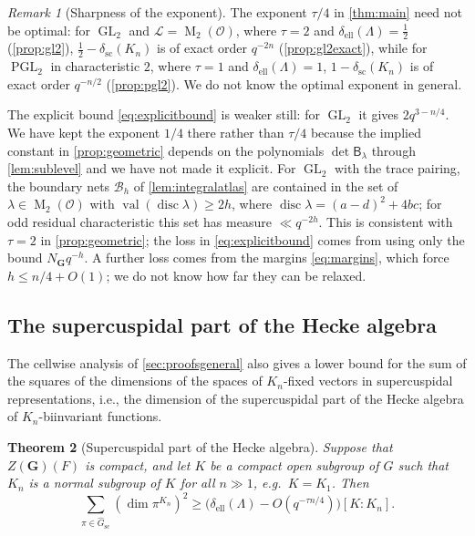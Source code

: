 \documentclass[11pt,reqno]{amsart}
\numberwithin{equation}{section}
\theoremstyle{plain}
\newtheorem{theorem}{Theorem}[section]
\theoremstyle{definition}
\theoremstyle{remark}
\newtheorem{remark}[theorem]{Remark}
\theoremstyle{plain}
\newcommand{\OO}{\mathcal{O}}    %
\newcommand{\Lat}{\mathcal{L}}   %
\newcommand{\dLat}{\Lambda}      %
\newcommand{\bG}{\mathbf{G}}     %
\newcommand{\g}{\mathfrak{g}}    %
\newcommand{\gd}{\mathfrak{g}^*} %
\newcommand{\scd}[1]{\delta_{\mathrm{sc}}(#1)}
\newcommand{\elld}[2][]{\delta_{\mathrm{ell}}^{#1}(#2)}  %
\newcommand{\Bad}{\mathcal{B}}   %
\newcommand{\bnets}{boundary nets}
\newcommand{\Pcss}{\mathscr{P}^{\mathrm{ss}}_{\mathrm{max}}}  %
\newcommand{\Nss}{N_{\bG}}  %
\newcommand{\Gsc}{\widehat{G}_{\mathrm{sc}}}    %
\DeclareMathOperator{\val}{val}
\DeclareMathOperator{\GL}{GL}
\DeclareMathOperator{\PGL}{PGL}
\DeclareMathOperator{\Mat}{M}
\DeclareMathOperator{\disc}{disc}
\newcommand{\eexp}{\tau}
\newcommand{\lf}{\lambda}
\newcommand{\Bf}{\mathsf{B}}
\begin{document}
\begin{remark}[Sharpness of the exponent]\label{rem:sharpness}
The exponent $\eexp/4$ in \cref{thm:main} need not be optimal:
for $\GL_2$ and $\Lat=\Mat_2(\OO)$, where $\eexp=2$ and
$\elld{\dLat}=\frac12$ (\cref{prop:gl2}), $\frac12-\scd{K_n}$ is of exact order $q^{-2n}$ (\cref{prop:gl2exact}), while for $\PGL_2$
in characteristic $2$, where $\eexp=1$ and $\elld{\dLat}=1$, $1-\scd{K_n}$ is of exact
order $q^{-n/2}$ (\cref{prop:pgl2}). We do not know the optimal exponent in general.

The explicit bound \eqref{eq:explicitbound} is weaker still: for $\GL_2$ it
gives $2q^{3-n/4}$. We have kept the exponent $1/4$ there rather than
$\eexp/4$ because the implied constant in \cref{prop:geometric} depends on the
polynomials $\det \Bf_\lf$ through \cref{lem:sublevel} and we have not
made it explicit.
For $\GL_2$ with the trace pairing, the \bnets{} $\Bad_h$ of \cref{lem:integralatlas} are
contained in the set of $\lf\in\Mat_2(\OO)$ with $\val(\disc\lf)\ge2h$, where
$\disc\lf=(a-d)^2+4bc$; for odd residual characteristic this set has measure
$\ll q^{-2h}$. This is consistent with $\eexp=2$ in \cref{prop:geometric};
the loss in \eqref{eq:explicitbound} comes from using only the bound
$\Nss q^{-h}$. A further loss comes from the margins
\eqref{eq:margins}, which force $h\le n/4+O(1)$; we do not know how far they
can be relaxed.
\end{remark}

\subsection{The supercuspidal part of the Hecke algebra}\label{sec:squares}
The cellwise analysis of \cref{sec:proofsgeneral} also gives a lower bound
for the sum of the squares of the dimensions of the spaces of $K_n$-fixed
vectors in supercuspidal representations, i.e., the dimension of the supercuspidal part
of the Hecke algebra of $K_n$-biinvariant functions.

\begin{theorem}[Supercuspidal part of the Hecke algebra]\label{thm:squares}
Suppose that $Z(\bG)(F)$ is compact, and let $K$ be a compact open
subgroup of $G$ such that $K_n$ is a normal subgroup of $K$ for all
$n\gg1$, e.g.\ $K=K_1$. Then
\begin{equation}\label{eq:squares}
\sum_{\pi\in\Gsc}(\dim\pi^{K_n})^2\ge\bigl(\elld{\dLat}-O(q^{-\eexp n/4})\bigr)[K:K_n].
\end{equation}
\end{theorem}
\end{document}

